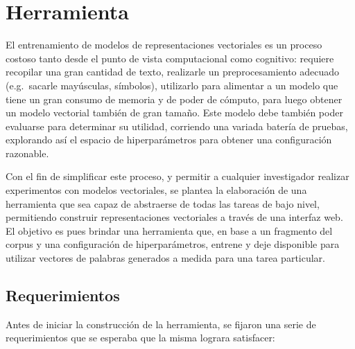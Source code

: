 \chapter{Herramienta}

El entrenamiento de modelos de representaciones vectoriales es un proceso costoso tanto desde el
punto de vista computacional como cognitivo: requiere recopilar una gran cantidad de texto,
realizarle un preprocesamiento adecuado (e.g.\ sacarle mayúsculas, símbolos), utilizarlo para
alimentar a un modelo que tiene un gran consumo de memoria y de poder de cómputo, para luego obtener
un modelo vectorial también de gran tamaño. Este modelo debe también poder evaluarse para determinar
su utilidad, corriendo una variada batería de pruebas, explorando así el espacio de hiperparámetros
para obtener una configuración razonable.

Con el fin de simplificar este proceso, y permitir a cualquier investigador realizar experimentos
con modelos vectoriales, se plantea la elaboración de una herramienta que sea capaz de abstraerse de
todas las tareas de bajo nivel, permitiendo construir representaciones vectoriales a través de una
interfaz web. El objetivo es pues brindar una herramienta que, en base a un fragmento del corpus y
una configuración de hiperparámetros, entrene y deje disponible para utilizar vectores de palabras
generados a medida para una tarea particular.


\section{Requerimientos}

Antes de iniciar la construcción de la herramienta, se fijaron una serie de requerimientos que se
esperaba que la misma lograra satisfacer:

